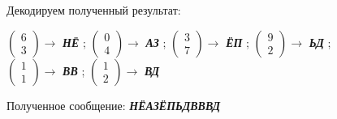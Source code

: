 \documentclass[a5paper, 10pt]{article}
\theoremstyle{definition}
\theoremstyle{plain}
\theoremstyle{remark}
\begin{document}
Декодируем полученный результат:
\begin{center}
 $ \begin{pmatrix}
 6\\
3
\end{pmatrix} \to$ \textbf{\textit{НЁ}} ;
 $ \begin{pmatrix}
 0\\
4
\end{pmatrix} \to$ \textbf{\textit{АЗ}} ;
 $ \begin{pmatrix}
 3\\
7
\end{pmatrix} \to$ \textbf{\textit{ЁП}} ;
 $ \begin{pmatrix}
9\\
2
\end{pmatrix} \to$ \textbf{\textit{ЬД}} ; \\
 $ \begin{pmatrix}
 1\\
1
\end{pmatrix} \to$ \textbf{\textit{ВВ}} ;
$\begin{pmatrix}
 1\\
2
\end{pmatrix} \to$ \textbf{\textit{ВД}}  \\
\end{center}
Полученное сообщение:  \textbf{\textit{НЁАЗЁПЬДВВВД}}
\end{document}
